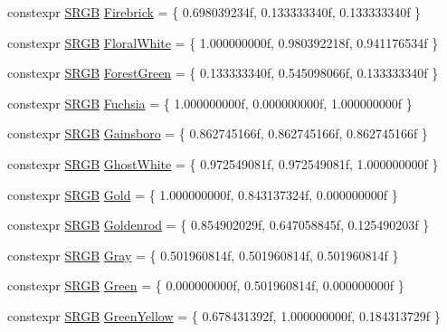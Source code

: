 \begin{DoxyCompactItemize}
\item 
constexpr \hyperlink{structmage_1_1_s_r_g_b}{S\+R\+GB} \hyperlink{namespacemage_1_1color_aee722564bc5af01bffa36d11da463c7d}{Firebrick} = \{ 0.\+698039234f, 0.\+133333340f, 0.\+133333340f \}
\item 
constexpr \hyperlink{structmage_1_1_s_r_g_b}{S\+R\+GB} \hyperlink{namespacemage_1_1color_aa82b9bd5ae0703f8fe79da0fdf163ee9}{Floral\+White} = \{ 1.\+000000000f, 0.\+980392218f, 0.\+941176534f \}
\item 
constexpr \hyperlink{structmage_1_1_s_r_g_b}{S\+R\+GB} \hyperlink{namespacemage_1_1color_a2d7e67954c6156e194165db58e58bc97}{Forest\+Green} = \{ 0.\+133333340f, 0.\+545098066f, 0.\+133333340f \}
\item 
constexpr \hyperlink{structmage_1_1_s_r_g_b}{S\+R\+GB} \hyperlink{namespacemage_1_1color_ace094140b3f356c536df67b441c9d98d}{Fuchsia} = \{ 1.\+000000000f, 0.\+000000000f, 1.\+000000000f \}
\item 
constexpr \hyperlink{structmage_1_1_s_r_g_b}{S\+R\+GB} \hyperlink{namespacemage_1_1color_a583df8c3b60258fd677dc01eed2d947f}{Gainsboro} = \{ 0.\+862745166f, 0.\+862745166f, 0.\+862745166f \}
\item 
constexpr \hyperlink{structmage_1_1_s_r_g_b}{S\+R\+GB} \hyperlink{namespacemage_1_1color_a97d27d6604ead54a2d60ca9b4f042783}{Ghost\+White} = \{ 0.\+972549081f, 0.\+972549081f, 1.\+000000000f \}
\item 
constexpr \hyperlink{structmage_1_1_s_r_g_b}{S\+R\+GB} \hyperlink{namespacemage_1_1color_a08ff3cba6a508f8891b7a7e4f9bd4130}{Gold} = \{ 1.\+000000000f, 0.\+843137324f, 0.\+000000000f \}
\item 
constexpr \hyperlink{structmage_1_1_s_r_g_b}{S\+R\+GB} \hyperlink{namespacemage_1_1color_a77a2452973e57ec9276e3b3e3098d3f6}{Goldenrod} = \{ 0.\+854902029f, 0.\+647058845f, 0.\+125490203f \}
\item 
constexpr \hyperlink{structmage_1_1_s_r_g_b}{S\+R\+GB} \hyperlink{namespacemage_1_1color_acae935f90935efc4d36a585ec161968e}{Gray} = \{ 0.\+501960814f, 0.\+501960814f, 0.\+501960814f \}
\item 
constexpr \hyperlink{structmage_1_1_s_r_g_b}{S\+R\+GB} \hyperlink{namespacemage_1_1color_a23cf53e0103434f767585df9dc75017a}{Green} = \{ 0.\+000000000f, 0.\+501960814f, 0.\+000000000f \}
\item 
constexpr \hyperlink{structmage_1_1_s_r_g_b}{S\+R\+GB} \hyperlink{namespacemage_1_1color_a59100450f627741d9b87d68870c000bc}{Green\+Yellow} = \{ 0.\+678431392f, 1.\+000000000f, 0.\+184313729f \}

\end{DoxyCompactItemize}
